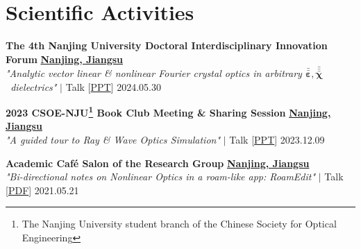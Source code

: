 
\section{Scientific Activities}
\label{Activities}
\begin{etaremune}[label={[\reversearabic*]},leftmargin=0.041\textwidth,itemsep=0pt]
	{\item \textbf{The 4th Nanjing University Doctoral Interdisciplinary Innovation Forum} \hfill \href{https://www.google.com/maps/place/\%E4\%B8\%AD\%E5\%9B\%BD\%E6\%B1\%9F\%E8\%8B\%8F\%E7\%9C\%81\%E5\%8D\%97\%E4\%BA\%AC\%E5\%B8\%82}{\textbf{Nanjing, Jiangsu}} \\ \textit{ "Analytic vector linear \& nonlinear Fourier crystal optics in arbitrary $\bar{\bar{\boldsymbol \varepsilon}}, \bar{\bar{\bar{\boldsymbol \chi}}}$ \!\! dielectrics"} $|$ {\color{color-detail} Talk} [\href{https://github.com/ChenZhu-Xie/PhD_academia/blob/master/2__Side_Projects/8.1__\%E5\%8D\%97\%E4\%BA\%AC\%E5\%A4\%A7\%E5\%AD\%A6\%E5\%8D\%9A\%E5\%A3\%AB\%E7\%94\%9F\%E5\%88\%9B\%E6\%96\%B0\%E8\%AE\%BA\%E5\%9D\%9B\%20talk\%20-\%20\%E4\%BB\%BB\%E6\%84\%8F\%20\%CE\%B5\%E2\%81\%BD\%C2\%B2\%E2\%81\%BE\%E3\%80\%81\%CF\%87\%E2\%81\%BD\%C2\%B3\%E2\%81\%BE\%20\%E7\%94\%B5\%E4\%BB\%8B\%E8\%B4\%A8\%20\%E4\%B8\%AD\%E7\%9A\%84\%20\%E8\%A7\%A3\%E6\%9E\%90\%E7\%9F\%A2\%E9\%87\%8F\%20\%E7\%BA\%BF\%E6\%80\%A7\%E3\%80\%81\%E9\%9D\%9E\%E7\%BA\%BF\%E6\%80\%A7\%20\%E5\%82\%85\%E7\%AB\%8B\%E5\%8F\%B6\%E5\%85\%89\%E5\%AD\%A6__4.0_year_-_2024.5.31.pdf}{\small PPT}] \hfill 2024.05.30}
	{\item \textbf{2023 CSOE-NJU\footnote{The Nanjing University student branch of the Chinese Society for Optical Engineering} Book Club Meeting \& Sharing Session} \hfill \href{https://www.google.com/maps/place/\%E4\%B8\%AD\%E5\%9B\%BD\%E6\%B1\%9F\%E8\%8B\%8F\%E7\%9C\%81\%E5\%8D\%97\%E4\%BA\%AC\%E5\%B8\%82}{\textbf{Nanjing, Jiangsu}} \\ \textit{ "A guided tour to Ray \& Wave Optics Simulation"} $|$ {\color{color-detail} Talk} [\href{https://github.com/ChenZhu-Xie/PhD_academia/blob/master/2__Side_Projects/7.1__A_guided_tour_to_Ray_\%26_Wave_Optics_Simulation_\%E2\%86\%90_JavaScript\%2BPython__3.5_year_-_2023.12.9.pdf}{\small PPT}] \hfill 2023.12.09}
	{\item \textbf{Academic Café Salon of the Research Group} \hfill \href{https://www.google.com/maps/place/\%E4\%B8\%AD\%E5\%9B\%BD\%E6\%B1\%9F\%E8\%8B\%8F\%E7\%9C\%81\%E5\%8D\%97\%E4\%BA\%AC\%E5\%B8\%82}{\textbf{Nanjing, Jiangsu}} \\ \textit{ "Bi-directional notes on Nonlinear Optics in a roam-like app: RoamEdit"} $|$ {\color{color-detail} Talk} [\href{https://github.com/ChenZhu-Xie/postgraduate_academia/blob/main/2__Side_Projects/2.1__Reading_Club\%EF\%BC\%9ANotes_with_Bi-directional_Links_in_RoamEdit__1.0_year_-_2021.5.21.pdf}{\small PDF}] \hfill 2021.05.21}
	{\item[] }
\end{etaremune}

